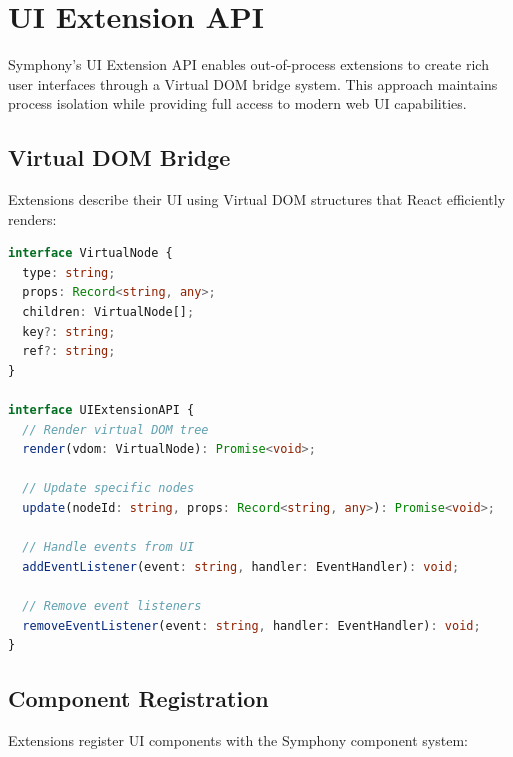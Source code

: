 \section*{UI Extension API}

Symphony's UI Extension API enables out-of-process extensions to create rich user interfaces through a Virtual DOM bridge system. This approach maintains process isolation while providing full access to modern web UI capabilities.

\subsection*{Virtual DOM Bridge}

Extensions describe their UI using Virtual DOM structures that React efficiently renders:

\begin{lstlisting}[language=TypeScript,caption={Virtual DOM Interface}]
interface VirtualNode {
  type: string;
  props: Record<string, any>;
  children: VirtualNode[];
  key?: string;
  ref?: string;
}

interface UIExtensionAPI {
  // Render virtual DOM tree
  render(vdom: VirtualNode): Promise<void>;
  
  // Update specific nodes
  update(nodeId: string, props: Record<string, any>): Promise<void>;
  
  // Handle events from UI
  addEventListener(event: string, handler: EventHandler): void;
  
  // Remove event listeners
  removeEventListener(event: string, handler: EventHandler): void;
}
\end{lstlisting}

\subsection*{Component Registration}

Extensions register UI components with the Symphony component system:

